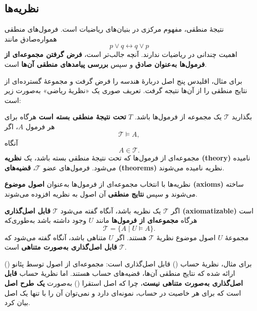\subsection*{ نظریه‌ها}
    نتیجهٔ منطقی، مفهوم مرکزی در بنیان‌های ریاضیات است.  
    فرمول‌های منطقی همواره‌صادق مانند
    \[
    p \lor q \leftrightarrow q \lor p
    \]
    اهمیت چندانی در ریاضیات ندارند. آنچه جالب‌تر است، \textbf{فرض گرفتن مجموعه‌ای از فرمول‌ها به‌عنوان صادق} و سپس \textbf{بررسی پیامدهای منطقی آن‌ها} است.
    
    برای مثال، اقلیدس پنج اصل دربارهٔ هندسه را فرض گرفت و مجموعهٔ گسترده‌ای از نتایج منطقی را از آن‌ها نتیجه گرفت.  
    تعریف صوری یک «نظریهٔ ریاضی» به‌صورت زیر است:
    
    \begin{definition}[تعریف \lr{2.55}]
      بگذارید $\mathscr{T}$ یک مجموعه از فرمول‌ها باشد. $T$ \textbf{تحت نتیجه‌ٔ منطقی بسته است} هرگاه برای هر فرمول $A$، اگر
      \[
        \mathscr{T} \models A,
      \]
      آنگاه
      \[
      A \in \mathscr{T}.
      \]
      مجموعه‌ای از فرمول‌ها که تحت نتیجه‌ٔ منطقی بسته باشد، یک \textbf{نظریه (theory)} نامیده می‌شود.  
      فرمول‌های عضو $\mathscr{T}$، \textbf{قضیه‌های (theorems)} نظریه نامیده می‌شوند.
    \end{definition}
    
    نظریه‌ها با انتخاب مجموعه‌ای از فرمول‌ها به‌عنوان \textbf{اصول موضوع (axioms)} ساخته می‌شوند و سپس \textbf{نتایج منطقی} آن اصول به نظریه افزوده می‌شوند.
    
    \begin{definition}[تعریف \lr{2.56}]
      اگر $\mathscr{T}$ یک نظریه باشد، آنگاه گفته می‌شود $\mathscr{T}$ \textbf{قابل اصل‌گذاری (axiomatizable)} است هرگاه \textbf{مجموعه‌ای از فرمول‌ها} مانند $U$ وجود داشته باشد به‌طوری‌که
      \[
      \mathscr{T} = \{A \mid U \models A\}.
      \]
      مجموعهٔ $U$ اصول موضوع نظریهٔ $\mathscr{T}$ هستند.  
      اگر $U$ متناهی باشد، آنگاه گفته می‌شود که $\mathscr{T}$ \textbf{قابل اصل‌گذاری به‌صورت متناهی} است.
    \end{definition}
    
    برای مثال، نظریهٔ حساب () قابل اصل‌گذاری است:  
    مجموعه‌ای از اصول توسط پئانو () ارائه شده که نتایج منطقی آن‌ها، قضیه‌های حساب هستند.  
    اما نظریهٔ حساب \textbf{قابل اصل‌گذاری به‌صورت متناهی نیست}، چرا که اصل استقرا () به‌صورت \textbf{یک طرح اصل} است که برای هر خاصیت در حساب، نمونه‌ای دارد و نمی‌توان آن را با تنها یک اصل بیان کرد.
